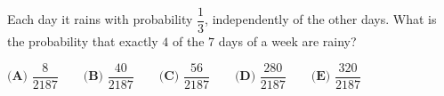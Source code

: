 Each day it rains with probability $\dfrac13$, independently of the other days. What is the probability that exactly $4$ of the $7$ days of a week are rainy?

$\textbf{(A) }\dfrac{8}{2187}\qquad\textbf{(B) }\dfrac{40}{2187}\qquad\textbf{(C) }\dfrac{56}{2187}\qquad\textbf{(D) }\dfrac{280}{2187}\qquad\textbf{(E) }\dfrac{320}{2187}$
